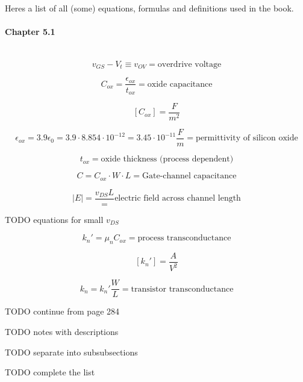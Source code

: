 Heres a list of all (some) equations, formulas and definitions used in
the book.

\paragraph{Chapter 5.1} \hfill \
$$v_{GS} - V_t \equiv v_{OV} = \text{overdrive voltage}$$

$$C_{ox} = \frac{\epsilon_{ox}}{t_{ox}} = \text{oxide capacitance}$$

$$[C_{ox}] = \frac{F}{m^2}$$

$$\epsilon_{ox} = 3.9\epsilon_0 = 3.9\cdot 8.854\cdot 10^{-12}
  = 3.45\cdot 10^{-11} \frac{F}{m} = \text{permittivity of silicon oxide}$$

$$t_{ox} = \text{oxide thickness (process dependent)}$$

$$C = C_{ox}\cdot W\cdot L = \text{Gate-channel capacitance}$$

$$|E| = \frac{v_{DS}{L}} = \text{electric field across channel length}$$

TODO equations for small $v_{DS}$

$$k_n' = \mu_n C_{ox} = \text{process transconductance}$$

$$[k_n'] = \frac{A}{V^2}$$

$$k_n = k_n' \frac{W}{L} = \text{transistor transconductance}$$

TODO continue from page 284

TODO notes with descriptions

TODO separate into subsubsections

TODO complete the list
